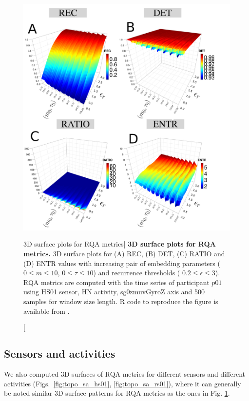 \begin{figure}
\centering
\includegraphics[width=1.0\textwidth]{fig_6_09}
    \caption
	[3D surface plots for RQA metrics]{
	{\bf 3D surface plots for RQA metrics.}
	3D surface plots for (A) REC, (B) DET, (C) RATIO and (D) ENTR values 
	with increasing pair of embedding parameters 
	($0 \le m \le 10$, $0 \le \tau \le 10$) 
	and recurrence thresholds (  $ 0.2 \le \epsilon \le 3 $).
	RQA metrics are computed with the time series of participant $p01$ using 
	HS01 sensor, HN activity, sg0zmuvGyroZ axis and 500 samples 
	for window size length.
        R code to reproduce the figure is available from \cite{xochicale2018}.
	}
\label{fig:topo_rqas}
\end{figure}

\newpage
\subsection{Sensors and activities}
We also computed 3D surfaces of RQA metrics for different sensors 
and different activities 
(Figs.~\ref{fig:topo_sa_hs01}, \ref{fig:topo_sa_rs01}), where it can 
generally be noted similar 3D surface patterns for RQA metrics as the ones
in Fig. \ref{fig:topo_rqas}. 

